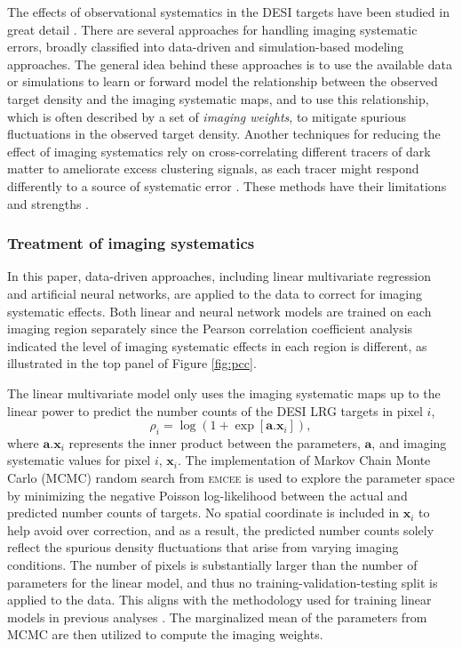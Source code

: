 The effects of observational systematics in the DESI targets have been studied in great detail \cite[see, e.g.,][]{kitanidis2020imaging, zhou2021clustering, chaussidon2022angular}. There are several approaches for handling imaging systematic errors, broadly classified into data-driven and simulation-based modeling approaches. The general idea behind these approaches is to use the available data or simulations to learn or forward model the relationship between the observed target density and the imaging systematic maps, and to use this relationship, which is often described by a set of \textit{imaging weights}, to mitigate spurious fluctuations in the observed target density. Another techniques for reducing the effect of imaging systematics rely on cross-correlating different tracers of dark matter to ameliorate excess clustering signals, as each tracer might respond differently to a source of systematic error \citep[see, e.g.,][]{giannantonio2014improved}. These methods have their limitations and strengths \citep[see, e.g.,][for a review]{2021MNRAS.503.5061W}.

\subsubsection{Treatment of imaging systematics}
In this paper, data-driven approaches, including linear multivariate regression and artificial neural networks, are applied to the data to correct for imaging systematic effects. Both linear and neural network models are trained on each imaging region separately since the Pearson correlation coefficient analysis indicated the level of imaging systematic effects in each region is different, as illustrated in the top panel of Figure \ref{fig:pcc}. 

The linear multivariate model only uses the imaging systematic maps up to the linear power to predict the number counts of the DESI LRG targets in pixel $i$,
\begin{equation}\label{eq:npred}
    \rho_{i} = \log ( 1 + \exp[\textbf{a}.\textbf{x}_{i}]),
\end{equation}
where $\textbf{a}.\textbf{x}_{i}$ represents the inner product between the parameters, $\textbf{a}$, and imaging systematic values for pixel $i$, $\textbf{x}_{i}$. The implementation of Markov Chain Monte Carlo (MCMC) random search from \textsc{emcee} \citep{2013PASP..125..306F} is used to explore the parameter space by minimizing the negative Poisson log-likelihood between the actual and predicted number counts of targets. No spatial coordinate is included in $\textbf{x}_{i}$ to help avoid over correction, and as a result, the predicted number counts solely reflect the spurious density fluctuations that arise from varying imaging conditions. The number of pixels is substantially larger than the number of parameters for the linear model, and thus no training-validation-testing split is applied to the data. This aligns with the methodology used for training linear models in previous analyses \citep[see, e.g.,][]{zhou2022target}. The marginalized mean of the parameters from MCMC are then utilized to compute the imaging weights.


